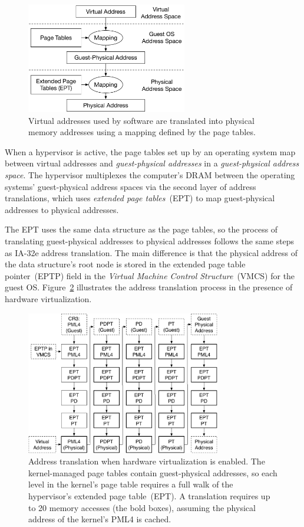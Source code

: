 \begin{figure}[hbt]
  \centering
  \includegraphics[width=70mm]{figures/vmx_address_translation.pdf}
  \caption{
    Virtual addresses used by software are translated into physical memory
    addresses using a mapping defined by the page tables.
  }
  \label{fig:vmx_address_translation}
\end{figure}


When a hypervisor is active, the page tables set up by an operating system map
between virtual addresses and \textit{guest-physical addresses} in a
\textit{guest-physical address space}. The hypervisor multiplexes the
computer's DRAM between the operating systems' guest-physical address spaces
via the second layer of address translations, which uses \textit{extended page
tables}~(EPT) to map guest-physical addresses to physical addresses.

The EPT uses the same data structure as the page tables, so the process of
translating guest-physical addresses to physical addresses follows the same
steps as IA-32e address translation. The main difference is that the physical
address of the data structure's root node is stored in the extended page table
pointer~(EPTP) field in the \textit{Virtual Machine Control Structure}~(VMCS)
for the guest OS. Figure~\ref{fig:vmx_paging} illustrates the address
translation process in the presence of hardware virtualization.

\begin{figure}[hbt]
  \centering
  \includegraphics[width=85mm]{figures/vmx_paging.pdf}
  \caption{
    Address translation when hardware virtualization is enabled. The
    kernel-managed page tables contain guest-physical addresses, so each level
    in the kernel's page table requires a full walk of the hypervisor's
    extended page table~(EPT).  A translation requires up to 20 memory accesses
    (the bold boxes), assuming the physical address of the kernel's PML4 is
    cached.
  }
  \label{fig:vmx_paging}
\end{figure}


